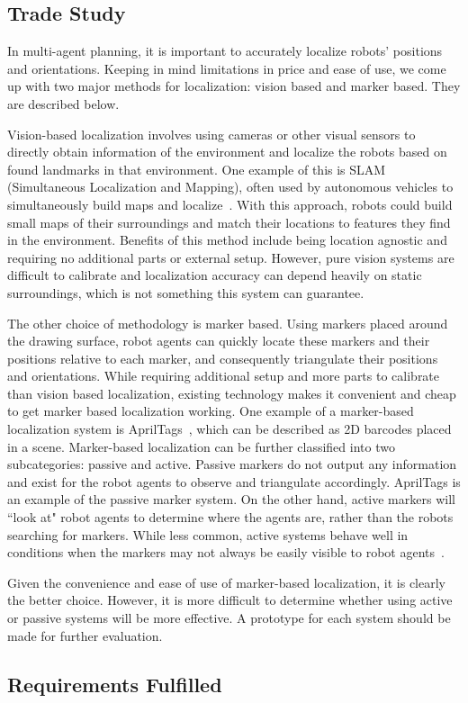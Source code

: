 \subsection{Trade Study}
\label{sec:trade_localization}
In multi-agent planning, it is important to accurately localize robots' positions and orientations. Keeping in mind limitations in price and ease of use, we come up with two major methods for localization: vision based and marker based. They are described below.

Vision-based localization involves using cameras or other visual sensors to directly obtain information of the environment and localize the robots based on found landmarks in that environment. One example of this is SLAM (Simultaneous Localization and Mapping), often used by autonomous vehicles to simultaneously build maps and localize~\cite{dissanayake2001solution}. With this approach, robots could build small maps of their surroundings and match their locations to features they find in the environment. Benefits of this method include being location agnostic and requiring no additional parts or external setup. However, pure vision systems are difficult to calibrate and localization accuracy can depend heavily on static surroundings, which is not something this system can guarantee.

The other choice of methodology is marker based. Using markers placed around the drawing surface, robot agents can quickly locate these markers and their positions relative to each marker, and consequently triangulate their positions and orientations. While requiring additional setup and more parts to calibrate than vision based localization, existing technology makes it convenient and cheap to get marker based localization working. One example of a marker-based localization system is AprilTags~\cite{olson2011apriltag}, which can be described as 2D barcodes placed in a scene. Marker-based localization can be further classified into two subcategories: passive and active. Passive markers do not output any information and exist for the robot agents to observe and triangulate accordingly. AprilTags is an example of the passive marker system. On the other hand, active markers will ``look at" robot agents to determine where the agents are, rather than the robots searching for markers. While less common, active systems behave well in conditions when the markers may not always be easily visible to robot agents~\cite{cassinis2005active}.

Given the convenience and ease of use of marker-based localization, it is clearly the better choice. However, it is more difficult to determine whether using active or passive systems will be more effective. A prototype for each system should be made for further evaluation.


\subsection{Requirements Fulfilled}
